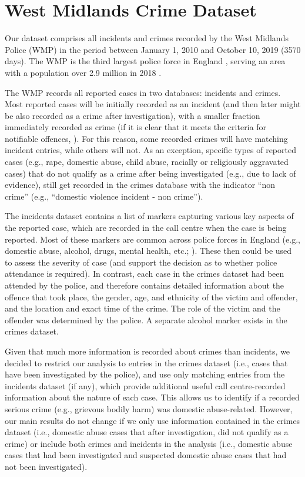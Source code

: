 \documentclass[12pt, a4paper]{article}
\begin{document}
\section{West Midlands Crime Dataset}


Our dataset comprises all incidents and crimes recorded by the West Midlands Police (WMP) in the period between January 1, 2010 and October 10, 2019 (3570 days). The WMP is the third largest police force in England \cite{Homeoffice}, serving an area with a population over 2.9 million in 2018 \cite{populationfigure}. 

The WMP records all reported cases in two databases: incidents and crimes. Most reported cases will be initially recorded as an incident (and then later might be also recorded as a crime after investigation), with a smaller fraction immediately recorded as crime (if it is clear that it meets the criteria for notifiable offences, ). For this reason, some recorded crimes will have matching incident entries, while others will not. As an exception, specific types of reported cases (e.g., rape, domestic abuse, child abuse, racially or religiously aggravated cases) that do not qualify as a crime after being investigated (e.g., due to lack of evidence), still get recorded in the crimes database with the indicator ``non crime'' (e.g., ``domestic violence incident - non crime'').


The incidents dataset contains a list of markers capturing various key aspects of the reported case, which are recorded in the call centre when the case is being reported. Most of these markers are common across police forces in England (e.g., domestic abuse, alcohol, drugs, mental health, etc.; ). 
These then could be used to assess the severity of case (and support the decision as to whether police attendance is required). 
In contrast, each case in the crimes dataset had been attended by the police, and therefore contains detailed information about the offence that took place, the gender, age, and ethnicity of the victim and offender, and the location and exact time of the crime. 
The role of the victim and the offender was determined by the police. 
A separate alcohol marker exists in the crimes dataset.

Given that much more information is recorded about crimes than incidents, we decided to restrict our analysis to entries in the crimes dataset (i.e., cases that have been investigated by the police), and use only matching entries from the incidents dataset (if any), which provide additional useful call centre-recorded information about the nature of each case. 
This allows us to identify if a recorded serious crime (e.g., grievous bodily harm) was domestic abuse-related. 
However, our main results do not change if we only use information contained in the crimes dataset (i.e., domestic abuse cases that after investigation, did not qualify as a crime) or include both crimes and incidents in the analysis (i.e., domestic abuse cases that had been investigated and suspected domestic abuse cases that had not been investigated).   
\end{document}
